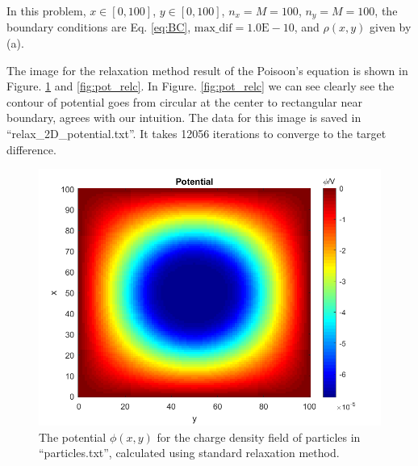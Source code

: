 \documentclass[12pt, graphicx]{article}
\begin{document}
In this problem, $x\in[0,100]$, $y\in[0,100]$, $n_x=M=100$, $n_y=M=100$, the boundary conditions are Eq.  \ref{eq:BC}, $\mathrm{max\_dif=1.0E-10}$, and $\rho(x,y)$ given by (a). \par
The image for the relaxation method result of the Poisoon's equation is shown in Figure. \ref{fig:pot_rel} and \ref{fig:pot_relc}. In Figure. \ref{fig:pot_relc} we can see clearly see the contour of potential goes from circular at the center to rectangular near boundary, agrees with our intuition. The data for this image is saved in \textquotedblleft relax\_2D\_potential.txt\textquotedblright. It takes 12056 iterations to converge to the target difference.

\begin{figure}[ht]
\centering
\includegraphics[width = 140mm]{potential.png}
\caption{The potential $\phi(x,y)$ for the charge density field of particles in \textquotedblleft particles.txt\textquotedblright, calculated using standard relaxation method.}
\label{fig:pot_rel}
\end{figure}

\clearpage
\end{document}

